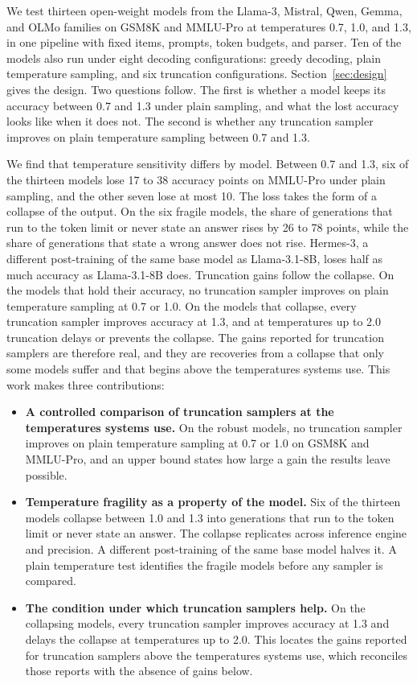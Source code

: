 \documentclass[11pt]{article}
\begin{document}
We test thirteen open-weight models from the Llama-3, Mistral, Qwen, Gemma, and OLMo families
on GSM8K and MMLU-Pro at temperatures 0.7, 1.0, and 1.3, in one pipeline with fixed items,
prompts, token budgets, and parser. Ten of the models also run under eight decoding
configurations: greedy decoding, plain temperature sampling, and six truncation configurations.
Section~\ref{sec:design} gives the design. Two questions follow. The first is whether a model
keeps its accuracy between 0.7 and 1.3 under plain sampling, and what the lost accuracy looks
like when it does not. The second is whether any truncation sampler improves on plain temperature
sampling between 0.7 and 1.3.

We find that temperature sensitivity differs by model. Between 0.7 and 1.3, six of the thirteen
models lose 17 to 38 accuracy points on MMLU-Pro under plain sampling, and the other seven lose
at most 10. The loss takes the form of a collapse of the output. On the six fragile models, the
share of generations that run to the token limit or never state an answer rises by 26 to 78
points, while the share of generations that state a wrong answer does not rise. Hermes-3, a
different post-training of the same base model as Llama-3.1-8B, loses half as much accuracy as
Llama-3.1-8B does. Truncation gains follow the
collapse. On the models that hold their accuracy, no truncation sampler improves on plain
temperature sampling at 0.7 or 1.0. On the models that collapse, every truncation sampler
improves accuracy at 1.3, and at temperatures up to 2.0 truncation delays or prevents the
collapse. The gains reported for truncation samplers are therefore real, and they are recoveries
from a collapse that only some models suffer and that begins above the temperatures systems
use. This work makes three contributions:

\begin{itemize}
\item \textbf{A controlled comparison of truncation samplers at the temperatures systems use.}
On the robust models, no truncation sampler improves on plain temperature sampling at 0.7 or
1.0 on GSM8K and MMLU-Pro, and an upper bound states how large a gain the results leave
possible.
\item \textbf{Temperature fragility as a property of the model.} Six of the thirteen models
collapse between 1.0 and 1.3 into generations that run to the token limit or never state an
answer. The collapse replicates across inference engine and precision. A different
post-training of the same base model halves it. A plain temperature test identifies the
fragile models before any sampler is compared.
\item \textbf{The condition under which truncation samplers help.} On the collapsing models,
every truncation sampler improves accuracy at 1.3 and delays the collapse at temperatures up
to 2.0. This locates the gains reported for truncation samplers above the temperatures systems
use, which reconciles those reports with the absence of gains below.
\end{itemize}
\end{document}
